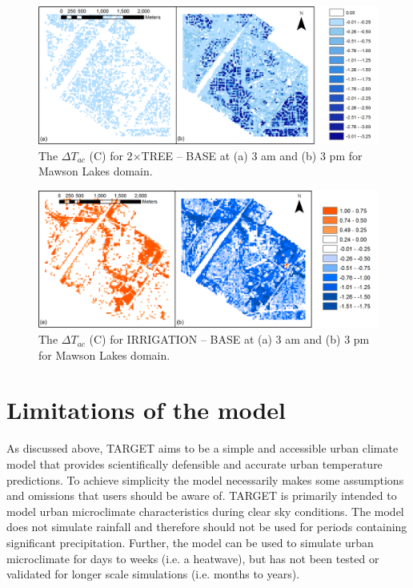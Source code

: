 \documentclass[journal abbreviation, manuscript]{copernicus}
\begin{document}
\begin{figure}[!htbp]
\includegraphics[width=1.0\textwidth,keepaspectratio]{figure9.png}
 \caption{The $\Delta T_{ac}$ (\degree C) for 2$\times$TREE -- BASE at (a) 3 am and (b) 3 pm for Mawson Lakes domain.} \label{fig:tree_scen}


\end{figure}

\begin{figure}[!htbp]

\includegraphics[width=1.0\textwidth,keepaspectratio]{figure10.png}

 \caption{The $\Delta T_{ac}$ (\degree C) for IRRIGATION -- BASE  at (a) 3 am and (b) 3 pm for Mawson Lakes domain.} \label{fig:irr_scen}


\end{figure}



\section{Limitations of the model}



As discussed above, TARGET aims to be a simple and accessible urban climate model that provides scientifically defensible and accurate urban temperature predictions. To achieve simplicity the model necessarily makes some  assumptions and omissions that users should be aware of.   TARGET is primarily intended to model urban microclimate characteristics during clear sky conditions. The model does not simulate rainfall and therefore should not be used for periods containing significant precipitation. Further, the model can be used to simulate urban microclimate for days to weeks (i.e. a heatwave), but has not been tested or validated for longer scale simulations (i.e. months to years). 
\end{document}
